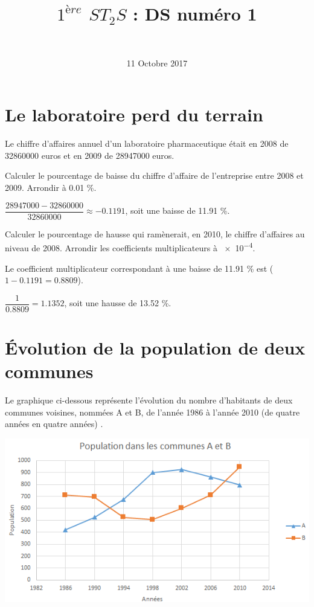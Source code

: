 \documentclass[a4paper,11pt]{exam}
\author{\ }
\date{11 Octobre 2017}
\title{$1^{ère}$ $ST_2S$ : DS num\'ero 1}
\begin{document}
%	

	\maketitle


\section{Le laboratoire perd du terrain}

Le chiffre d'affaires annuel d'un laboratoire pharmaceutique était en 2008 de \num{32860000} euros et en 2009 de \num{28947000} euros.
\begin{questions}
	\question Calculer le pourcentage de baisse du chiffre d'affaire de l'entreprise entre 2008 et 2009. Arrondir à \num{0.01} \%.
	\begin{solution}
		$\dfrac{\num{28947000} - \num{32860000}}{\num{32860000}} \approx \num{-0.1191}$, soit une baisse de \num{11.91} \%.
	\end{solution}
	
	\question Calculer le pourcentage de hausse qui ramènerait, en 2010, le chiffre d'affaires au niveau de 2008. Arrondir les coefficients multiplicateurs à \num{e-4}.
	\begin{solution}
		Le coefficient multiplicateur correspondant à une baisse de \num{11.91} \% est ($1-\num{0.1191} = \num{0.8809}$).
		
		$\dfrac{1}{\num{0.8809}} = \num{1.1352}$, soit une hausse de \num{13.52} \%.
	\end{solution}
\end{questions}


\section{\'Evolution de la population de deux communes}


Le graphique ci-dessous représente l'évolution du nombre d'habitants de deux communes voisines, nommées A et B, de l'année 1986 à l'année 2010 (de quatre années en quatre années) .

\begin{center}
	\includegraphics[scale=0.7]{./graph}
\end{center}
\end{document}
